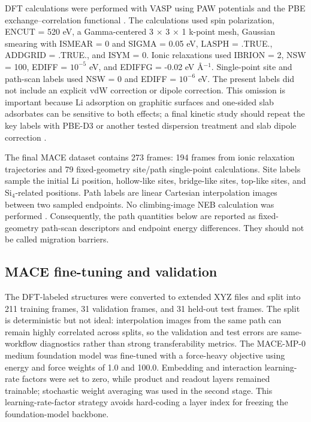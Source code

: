 \documentclass[12pt]{article}
\begin{document}
DFT calculations were performed with VASP \citep{kresse1996efficient,kresse1996cms} using PAW potentials \citep{blochl1994paw,kresse1999paw} and the PBE exchange--correlation functional \citep{perdew1996pbe}. The calculations used spin polarization, ENCUT = 520 eV, a Gamma-centered 3 $\times$ 3 $\times$ 1 k-point mesh, Gaussian smearing with ISMEAR = 0 and SIGMA = 0.05 eV, LASPH = .TRUE., ADDGRID = .TRUE., and ISYM = 0. Ionic relaxations used IBRION = 2, NSW = 100, EDIFF = $10^{-5}$ eV, and EDIFFG = -0.02 eV \AA$^{-1}$. Single-point site and path-scan labels used NSW = 0 and EDIFF = $10^{-6}$ eV. The present labels did not include an explicit vdW correction or dipole correction. This omission is important because Li adsorption on graphitic surfaces and one-sided slab adsorbates can be sensitive to both effects; a final kinetic study should repeat the key labels with PBE-D3 or another tested dispersion treatment and slab dipole correction \citep{grimme2010d3}.

The final MACE dataset contains 273 frames: 194 frames from ionic relaxation trajectories and 79 fixed-geometry site/path single-point calculations. Site labels sample the initial Li position, hollow-like sites, bridge-like sites, top-like sites, and Si$_4$-related positions. Path labels are linear Cartesian interpolation images between two sampled endpoints. No climbing-image NEB calculation was performed \citep{henkelman2000neb}. Consequently, the path quantities below are reported as fixed-geometry path-scan descriptors and endpoint energy differences. They should not be called migration barriers.

\subsection{MACE fine-tuning and validation}

The DFT-labeled structures were converted to extended XYZ files and split into 211 training frames, 31 validation frames, and 31 held-out test frames. The split is deterministic but not ideal: interpolation images from the same path can remain highly correlated across splits, so the validation and test errors are same-workflow diagnostics rather than strong transferability metrics. The MACE-MP-0 medium foundation model \citep{batatia2025foundation} was fine-tuned with a force-heavy objective using energy and force weights of 1.0 and 100.0. Embedding and interaction learning-rate factors were set to zero, while product and readout layers remained trainable; stochastic weight averaging was used in the second stage. This learning-rate-factor strategy avoids hard-coding a layer index for freezing the foundation-model backbone.
\end{document}
